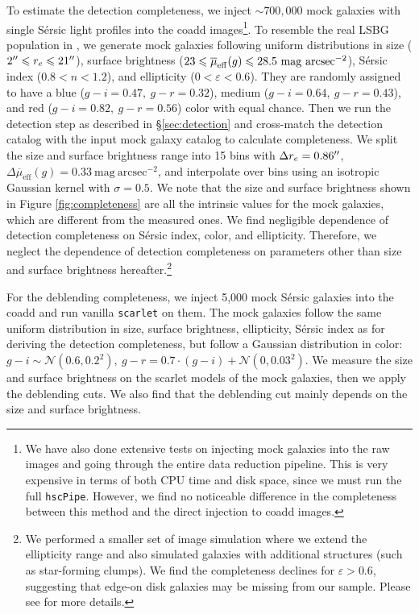 \documentclass[twocolumn,astrosymb,twocolappendix]{aastex631}
\newcommand{\sbunit}{\mathrm{mag\ arcsec}^{-2}}
\newcommand{\sbeff}{\overline{\mu}_{\mathrm{eff}}(g)}
\newcommand{\code}[1]{\texttt{#1}}
\newcommand{\sersic}{S\'ersic}
\begin{document}
\begin{CJK*}{UTF8}{gbsn}
To estimate the detection completeness, we inject $\sim 700,000$ mock galaxies with single \sersic{} light profiles into the coadd images\footnote{We have also done extensive tests on injecting mock galaxies into the raw images and going through the entire data reduction pipeline. This is very expensive in terms of both CPU time and disk space, since we must run the full \code{hscPipe}. However, we find no noticeable difference in the completeness between this method and the direct injection to coadd images.}. To resemble the real LSBG population in , we generate mock galaxies following uniform distributions in size ($2\mbox{$^{\prime\prime}$} \leqslant r_{e} \leqslant 21\mbox{$^{\prime\prime}$}$), surface brightness ($23 \leqslant \overline{\mu}_{\rm eff}(g) \leqslant 28.5\ \mathrm{mag\ arcsec^{-2}}$), \sersic{} index ($0.8 < n < 1.2$), and ellipticity ($0 < \varepsilon < 0.6$). They are randomly assigned to have a blue ($g-i=0.47,\ g-r=0.32$), medium ($g-i=0.64,\ g-r=0.43$), and red ($g-i=0.82,\ g-r=0.56$) color with equal chance. Then we run the detection step as described in \S \ref{sec:detection} and cross-match the detection catalog with the input mock galaxy catalog to calculate completeness. We split the size and surface brightness range into 15 bins with $\Delta r_e = 0.86\mbox{$^{\prime\prime}$}$, $\Delta \sbeff = 0.33\ \sbunit$, and interpolate over bins using an isotropic Gaussian kernel with $\sigma = 0.5$. We note that the size and surface brightness shown in Figure \ref{fig:completeness} are all the intrinsic values for the mock galaxies, which are different from the measured ones. We find negligible dependence of detection completeness on \sersic{} index, color, and ellipticity. Therefore, we neglect the dependence of detection completeness on parameters other than size and surface brightness hereafter.\footnote{We performed a smaller set of image simulation where we extend the ellipticity range and also simulated galaxies with additional structures (such as star-forming clumps). We find the completeness declines for $\varepsilon > 0.6$, suggesting that edge-on disk galaxies may be missing from our sample. Please see \citet{Greene2022} for more details.}

For the deblending completeness, we inject 5,000 mock \sersic{} galaxies into the coadd and run vanilla \code{scarlet} on them. The mock galaxies follow the same uniform distribution in size, surface brightness, ellipticity, \sersic{} index as for deriving the detection completeness, but follow a Gaussian distribution in color: $g-i \sim \mathcal{N}(0.6, 0.2^2),\ g-r = 0.7 \cdot (g-i) + \mathcal{N}(0, 0.03^2)$. We measure the size and surface brightness on the scarlet models of the mock galaxies, then we apply the deblending cuts. We also find that the deblending cut mainly depends on the size and surface brightness. 


\end{CJK*}
\end{document}
